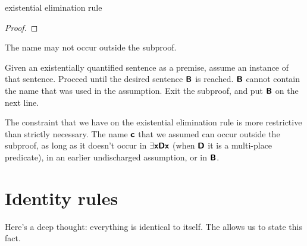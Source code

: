 \begin{factboxy}{existential elimination rule}
\begin{proof}
	\open
		 \as{}
	\close
	 
\end{proof}

\small{The name  may not occur outside the subproof.\smallskip

Given an existentially quantified sentence as a premise, assume an instance of that sentence. Proceed until the desired sentence $\bm{\mathsf{B}}$ is reached. $\bm{\mathsf{B}}$ cannot contain the name that was used in the assumption. Exit the subproof, and put $\bm{\mathsf{B}}$ on the next line.
}
\end{factboxy}



\begin{notebox}
The constraint that we have on the existential elimination rule is more restrictive than strictly necessary. The name $\bm{\mathsf{c}}$ that we assumed can occur outside the subproof, as long as it doesn't occur in $\exists \bm{\mathsf{x}}\bm{\mathsf{Dx}}$ (when $\bm{\mathsf{D}}$ it is a multi-place predicate), in an earlier undischarged assumption, or in $\bm{\mathsf{B}}$.
\end{notebox}


\section{Identity rules}

Here's a deep thought: everything is identical to itself. The  allows us to state this fact.

